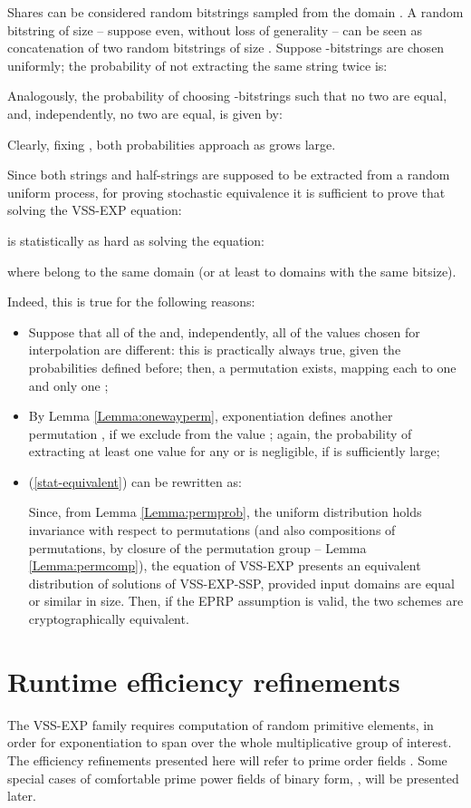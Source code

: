 \documentclass[10pt,journal,cspaper,compsoc]{IEEEtran}
\begin{document}
\begin{IEEEproof}
Shares can be considered random bitstrings sampled from the domain . A random bitstring of size  -- suppose  even, without loss of generality -- can be seen as concatenation of two random bitstrings of size .
Suppose  -bitstrings are chosen uniformly; the probability of not extracting the same string twice is:

Analogously, the probability of choosing  -bitstrings  such that no two  are equal, and, independently, no two  are equal, is given by:

Clearly, fixing , both probabilities approach  as  grows large.

Since both strings and half-strings are supposed to be extracted from a random uniform process, for proving stochastic equivalence it is sufficient to prove that solving the VSS-EXP equation:

is statistically as hard as solving the equation:

where  belong to the same domain  (or at least to domains with the same bitsize).

Indeed, this is true for the following reasons:

\begin{itemize}
\item Suppose that all of the  and, independently, all of the  values chosen for interpolation are different: this is practically always true, given the probabilities defined before; then, a permutation  exists, mapping each  to one and only one ;
\item By Lemma \ref{Lemma:onewayperm}, exponentiation  defines another permutation , if we exclude from  the value ; again, the probability of extracting at least one  value for any  or  is negligible, if  is sufficiently large;
\item (\ref{stat-equivalent}) can be rewritten as:

Since, from Lemma \ref{Lemma:permprob}, the uniform distribution holds invariance with respect to permutations (and also compositions of permutations, by closure of the permutation group -- Lemma \ref{Lemma:permcomp}), the equation of VSS-EXP presents an equivalent distribution of solutions of VSS-EXP-SSP, provided input domains are equal or similar in size. Then, if the EPRP assumption is valid, the two schemes are cryptographically equivalent.
\end{itemize}
\end{IEEEproof}

\section{Runtime efficiency refinements}
\label{runtime-efficiency-section}
The VSS-EXP family requires computation of random primitive elements, in order for exponentiation to span over the whole multiplicative group of interest. The efficiency refinements presented here will refer to prime order fields . Some special cases of comfortable prime power fields of binary form, , will be presented later.
\end{document}
